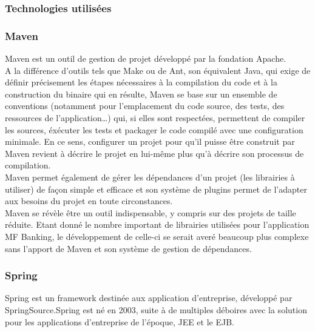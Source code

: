 \subsubsection{Technologies utilisées}

\subsubsection*{Maven}

Maven est un outil de gestion de projet développé par la fondation Apache.\\
A la différence d'outils tels que Make ou de Ant, son équivalent Java, qui exige de définir précisement les étapes nécessaires à la compilation du code et à la construction du binaire qui en résulte, Maven se base sur un ensemble de conventions (notamment pour l'emplacement du code source, des tests, des ressources de l'application\ldots) qui, si elles sont respectées, permettent de compiler les sources, éxécuter les tests et packager le code compilé avec une configuration minimale. En ce sens, configurer un projet pour qu'il puisse être construit par Maven revient à décrire le projet en lui-m\^eme plus qu'à décrire son processus de compilation.\\

Maven permet également de gérer les dépendances d'un projet (les librairies à utiliser) de façon simple et efficace et son système de plugins permet de l'adapter aux besoins du projet en toute circonstances.\\

Maven se révèle être un outil indispensable, y compris sur des projets de taille réduite. Etant donné le nombre important de librairies utilisées pour l'application MF Banking, le développement de celle-ci se serait averé beaucoup plus complexe sans l'apport de Maven et son système de gestion de dépendances. 

\subsubsection*{Spring}

Spring est un framework destinée aux application d'entreprise, développé par SpringSource.Spring est né en 2003, suite à de multiples déboires avec la solution pour les applications d'entreprise de l'époque, JEE et le EJB.\\

